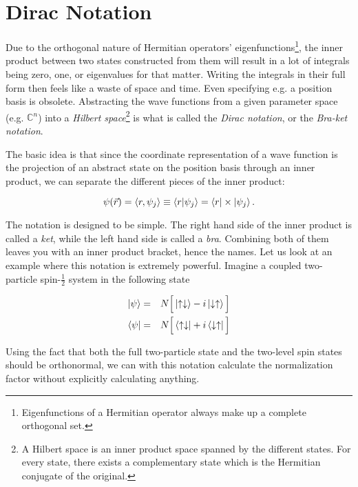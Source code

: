 \chapter{Dirac Notation}
\label{app:Dirac}

Due to the orthogonal nature of Hermitian operators' eigenfunctions\footnote{Eigenfunctions of a Hermitian operator always make up a complete orthogonal set.}, the inner product between two states constructed from them will result in a lot of integrals being zero, one, or eigenvalues for that matter. Writing the integrals in their full form then feels like a waste of space and time. Even specifying e.g. a position basis is obsolete. Abstracting the wave functions from a given parameter space (e.g. $\mathbb{C}^n$) into a \textit{Hilbert space}\footnote{A Hilbert space is an inner product space spanned by the different states. For every state, there exists a complementary state which is the Hermitian conjugate of the original\cite{griffiths}.} is what is called the \textit{Dirac notation}, or the \textit{Bra-ket notation}.

The basic idea is that since the coordinate representation of a wave function is the projection of an abstract state on the position basis through an inner product, we can separate the different pieces of the inner product:

\begin{equation*}
 \psi(\vec r) = \langle r, \psi_j \rangle \equiv \left\langle r | \psi_j\right\rangle = \left< r \right|\times\left| \psi_j \right>. 
\end{equation*}


The notation is designed to be simple. The right hand side of the inner product is called a \textit{ket}, while the left hand side is called a \textit{bra}. Combining both of them leaves you with an inner product bracket, hence the names. Let us look at an example where this notation is extremely powerful. Imagine a coupled two-particle spin-$\frac{1}{2}$ system in the following state

\begin{eqnarray}
 \left| \psi \right> &=& N\Big[\left| \uparrow\downarrow \right> -i\left| \downarrow\uparrow \right>\Big]\\
 \left< \psi \right| &=& N\Big[\left< \uparrow\downarrow \right| +i\left< \downarrow\uparrow \right|\Big]
\end{eqnarray} 

Using the fact that both the full two-particle state and the two-level spin states should be orthonormal, we can with this notation calculate the normalization factor without explicitly calculating anything.

